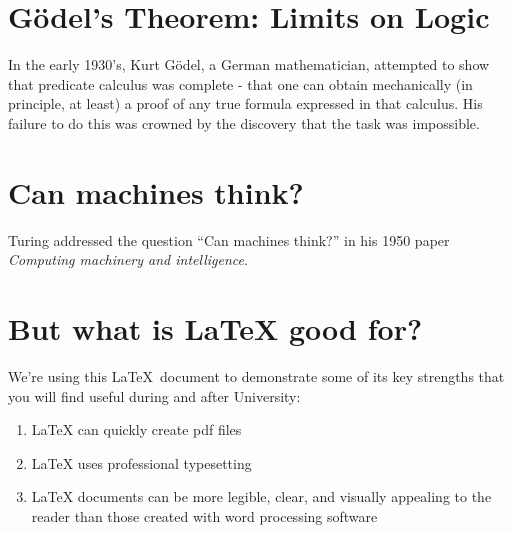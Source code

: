 \documentclass[a4paper]{article}
\begin{document}
\section{Gödel's Theorem: Limits on Logic}
In the early 1930's, Kurt Gödel, a German mathematician, attempted to show that predicate calculus was complete - that one can obtain mechanically  (in principle, at least) a proof of any true formula expressed in that calculus. His failure to do this was crowned by the discovery that the task was impossible.

\section{Can machines think?}
Turing addressed the question ``Can machines think?'' in his 1950 paper \textit{Computing machinery and intelligence}.

\section{But what is LaTeX good for?}
We're using this \LaTeX\ document to demonstrate some of its key strengths that you will find useful during and after University:

\begin{enumerate}
\item LaTeX can quickly create pdf files
\item LaTeX uses professional typesetting
\item LaTeX documents can be more legible, clear, and visually appealing to the reader than those created with word processing software
\end{enumerate}
\end{document}
